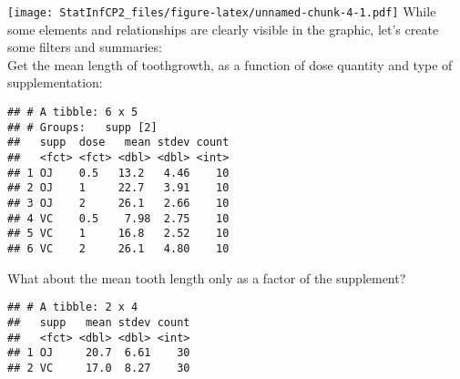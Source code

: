 \documentclass[]{article}
\newenvironment{Shaded}{\begin{snugshade}}{\end{snugshade}}
\newcommand{\DataTypeTok}[1]{\textcolor[rgb]{0.13,0.29,0.53}{#1}}
\newcommand{\DecValTok}[1]{\textcolor[rgb]{0.00,0.00,0.81}{#1}}
\newcommand{\KeywordTok}[1]{\textcolor[rgb]{0.13,0.29,0.53}{\textbf{#1}}}
\newcommand{\NormalTok}[1]{#1}
\newcommand{\OperatorTok}[1]{\textcolor[rgb]{0.81,0.36,0.00}{\textbf{#1}}}
\newcommand{\StringTok}[1]{\textcolor[rgb]{0.31,0.60,0.02}{#1}}
\begin{document}
\texttt{[image: StatInfCP2\_files/figure-latex/unnamed-chunk-4-1.pdf]}
While some elements and relationships are clearly visible in the
graphic, let's create some filters and summaries:\\
Get the mean length of toothgrowth, as a function of dose quantity and
type of supplementation:

\begin{Shaded}
\end{Shaded}

\begin{verbatim}
## # A tibble: 6 x 5
## # Groups:   supp [2]
##   supp  dose   mean stdev count
##   <fct> <fct> <dbl> <dbl> <int>
## 1 OJ    0.5   13.2   4.46    10
## 2 OJ    1     22.7   3.91    10
## 3 OJ    2     26.1   2.66    10
## 4 VC    0.5    7.98  2.75    10
## 5 VC    1     16.8   2.52    10
## 6 VC    2     26.1   4.80    10
\end{verbatim}

What about the mean tooth length only as a factor of the supplement?

\begin{Shaded}
\end{Shaded}

\begin{verbatim}
## # A tibble: 2 x 4
##   supp   mean stdev count
##   <fct> <dbl> <dbl> <int>
## 1 OJ     20.7  6.61    30
## 2 VC     17.0  8.27    30
\end{verbatim}
\end{document}
